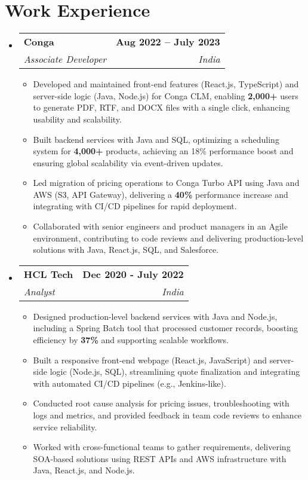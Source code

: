 \documentclass[letterpaper,11pt]{article}
\makeatletter
\newcommand{\resumeItem}[1]{
  \item\small{
    {#1 \vspace{0pt}}
  }
}
\newcommand{\resumeSubheading}[4]{
  \vspace{-2pt}\item
    \begin{tabular*}{1.0\textwidth}[t]{l@{\extracolsep{\fill}}r}
      \textbf{#1} & \textbf{\small #2} \\
      \textit{\small #3} & \textit{\small #4} \\
    \end{tabular*}\vspace{-7pt}
}
\newcommand{\resumeSubHeadingListStart}{\begin{itemize}[leftmargin=0.0in, label={}]}
\newcommand{\resumeSubHeadingListEnd}{\end{itemize}\vspace{0pt}}
\newcommand{\resumeItemListStart}{\begin{itemize}}
\newcommand{\resumeItemListEnd}{\end{itemize}\vspace{-5pt}}
\makeatother
\begin{document}
\section{Work Experience}
\resumeSubHeadingListStart
  \resumeSubheading{Conga}{Aug 2022 – July 2023}{Associate Developer}{India} 
  \resumeItemListStart
    \resumeItem{Developed and maintained front-end features (React.js, TypeScript) and server-side logic (Java, Node.js) for Conga CLM, enabling \textbf{2,000+} users to generate PDF, RTF, and DOCX files with a single click, enhancing usability and scalability.}
    \resumeItem{Built backend services with Java and SQL, optimizing a scheduling system for \textbf{4,000+} products, achieving an 18\% performance boost and ensuring global scalability via event-driven updates.}
    \resumeItem{Led migration of pricing operations to Conga Turbo API using Java and AWS (S3, API Gateway), delivering a \textbf{40\%} performance increase and integrating with CI/CD pipelines for rapid deployment.}
    \resumeItem{Collaborated with senior engineers and product managers in an Agile environment, contributing to code reviews and delivering production-level solutions with Java, React.js, SQL, and Salesforce.}
  \resumeItemListEnd

  \vspace{-7pt} %
  \resumeSubheading{HCL Tech}{Dec 2020 - July 2022}{Analyst}{India} 
  \resumeItemListStart
    \resumeItem{Designed production-level backend services with Java and Node.js, including a Spring Batch tool that processed customer records, boosting efficiency by \textbf{37\%} and supporting scalable workflows.}
    \resumeItem{Built a responsive front-end webpage (React.js, JavaScript) and server-side logic (Node.js, SQL), streamlining quote finalization and integrating with automated CI/CD pipelines (e.g., Jenkins-like).}
    \resumeItem{Conducted root cause analysis for pricing issues, troubleshooting with logs and metrics, and provided feedback in team code reviews to enhance service reliability.}
    \resumeItem{Worked with cross-functional teams to gather requirements, delivering SOA-based solutions using REST APIs and AWS infrastructure with Java, React.js, and Node.js.}
  \resumeItemListEnd
\vspace{-12pt} %
\resumeSubHeadingListEnd

\end{document}
